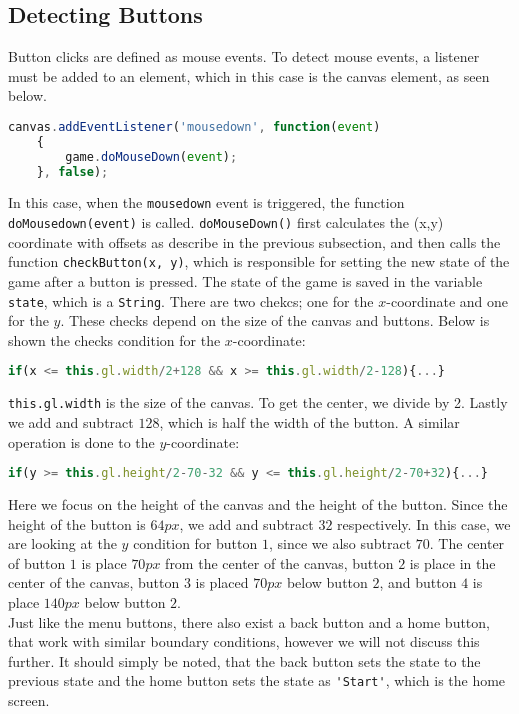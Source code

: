 \subsection{Detecting Buttons}

Button clicks are defined as mouse events. To detect mouse events, a listener must be added to an element, which in this case is the canvas element, as seen below.

\begin{lstlisting}[language=JavaScript, caption=Add event listener to canvas]
canvas.addEventListener('mousedown', function(event)
	{
		game.doMouseDown(event);
	}, false);
\end{lstlisting}

In this case, when the \verb|mousedown| event is triggered, the function\\
\verb|doMousedown(event)| is called. \verb|doMouseDown()| first calculates the (x,y) coordinate with offsets as describe in the previous subsection, and then calls the function \verb|checkButton(x, y)|, which is responsible for setting the new state of the game after a button is pressed. The state of the game is saved in the variable \verb|state|, which is a \verb|String|. There are two chekcs; one for the $x$-coordinate and one for the $y$. These checks depend on the size of the canvas and buttons. Below is shown the checks condition for the $x$-coordinate:

\begin{lstlisting}[language=JavaScript, caption=x condition check for menu buttons]
if(x <= this.gl.width/2+128 && x >= this.gl.width/2-128){...}
\end{lstlisting}

\verb|this.gl.width| is the size of the canvas. To get the center, we divide by 2. Lastly we add and subtract $128$, which is half the width of the button. A similar operation is done to the $y$-coordinate:

\begin{lstlisting}[language=JavaScript, caption=y condition check for menu buttons]
if(y >= this.gl.height/2-70-32 && y <= this.gl.height/2-70+32){...}
\end{lstlisting}

Here we focus on the height of the canvas and the height of the button. Since the height of the button is $64px$, we add and subtract $32$ respectively. In this case, we are looking at the $y$ condition for button $1$, since we also subtract $70$. The center of button $1$ is place $70px$ from the center of the canvas, button $2$ is place in the center of the canvas, button $3$ is placed $70px$ below button $2$, and button $4$ is place $140px$ below button $2$.\\

Just like the menu buttons, there also exist a back button and a home button, that work with similar boundary conditions, however we will not discuss this further. It should simply be noted, that the back button sets the state to the previous state and the home button sets the state as \verb|'Start'|, which is the home screen.